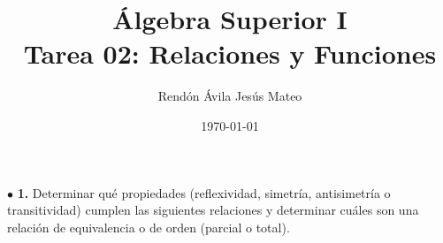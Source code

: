 \documentclass[12pt]{article}
\title{\textbf{Álgebra Superior I\\
Tarea 02: Relaciones y Funciones}}
\author{Rendón Ávila Jesús Mateo}
\date{\today}
\begin{document}


%
%
$\bullet$ \textbf{1.} Determinar qué propiedades (reflexividad, simetría, antisimetría o transitividad) cumplen las siguientes
relaciones y determinar cuáles son una relación de equivalencia o de orden (parcial o total).
\end{document}
